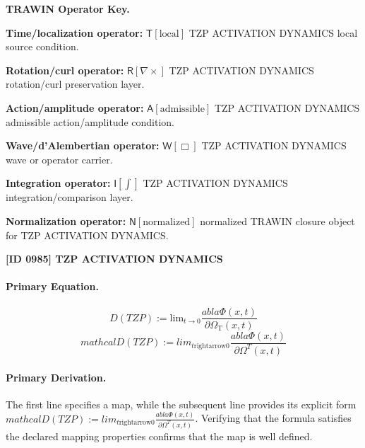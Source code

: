 \par\vspace{0.45\baselineskip}
\noindent\begin{minipage}[t]{\linewidth}
\begingroup
\small
\raggedright
\textbf{TRAWIN Operator Key.}\par
\noindent\textbf{Time/localization operator:} $\mathsf{T}\!\left[\mathrm{local}\right]$ TZP ACTIVATION DYNAMICS local source condition.\par
\noindent\textbf{Rotation/curl operator:} $\mathsf{R}\!\left[\nabla\times\right]$ TZP ACTIVATION DYNAMICS rotation/curl preservation layer.\par
\noindent\textbf{Action/amplitude operator:} $\mathsf{A}\!\left[\mathrm{admissible}\right]$ TZP ACTIVATION DYNAMICS admissible action/amplitude condition.\par
\noindent\textbf{Wave/d'Alembertian operator:} $\mathsf{W}\!\left[\Box\right]$ TZP ACTIVATION DYNAMICS wave or operator carrier.\par
\noindent\textbf{Integration operator:} $\mathsf{I}\!\left[\int\right]$ TZP ACTIVATION DYNAMICS integration/comparison layer.\par
\noindent\textbf{Normalization operator:} $\mathsf{N}\!\left[\mathrm{normalized}\right]$ normalized TRAWIN closure object for TZP ACTIVATION DYNAMICS.\par
\endgroup
\end{minipage}

\clearpage
\noindent\textbf{[ID 0985] TZP ACTIVATION DYNAMICS}\par
\vspace{0.35em}
\paragraph{Primary Equation.}
\[
D(TZP) := \mathrm{lim}_{t \to 0} \frac{ abla \Phi(x,t)}{\partial \Omega_{\mathrm{T}}(x,t)}
\]
\[
mathcal{D}(TZP):=lim_{t\mathrm{rightarrow}0}\frac{ abla\Phi(x,t)}{\partial\Omega^{T}(x,t)}
\]

\paragraph{Primary Derivation.}
The first line specifies a map, while the subsequent line provides its explicit form \( mathcal{D}(TZP):=lim_{t\mathrm{rightarrow}0}\frac{ abla\Phi(x,t)}{\partial\Omega^{T}(x,t)} \). Verifying that the formula satisfies the declared mapping properties confirms that the map is well defined.
